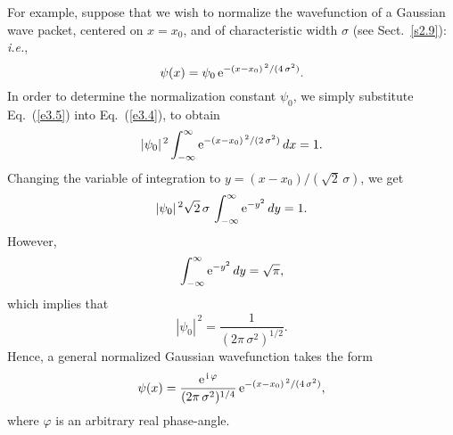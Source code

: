 For example, suppose that we wish to normalize the wavefunction of
a Gaussian wave packet, centered on $x=x_0$, and of characteristic
width $\sigma$ (see Sect.~\ref{s2.9}): {\em i.e.}, 
\begin{equation}\label{e3.5}
\psi(x) = \psi_0\,{\rm e}^{-(x-x_0)^{\,2}/(4\,\sigma^2)}.
\end{equation}
In order to determine the normalization constant $\psi_0$, we simply substitute
Eq.~(\ref{e3.5}) into Eq.~(\ref{e3.4}), to obtain
\begin{equation}
|\psi_0|^{\,2}\int_{-\infty}^{\infty}{\rm e}^{-(x-x_0)^{\,2}/(2\,\sigma^2)}\,dx = 1.
\end{equation}
Changing the variable of integration to $y=(x-x_0)/(\sqrt{2}\,\sigma)$, we get
\begin{equation}
|\psi_0|^{\,2}\sqrt{2}\,\sigma\,\int_{-\infty}^{\infty}{\rm e}^{-y^2}\,dy=1.
\end{equation}
However,
\begin{equation}\label{e3.8}
\int_{-\infty}^{\infty}{\rm e}^{-y^2}\,dy = \sqrt{\pi},
\end{equation}
which implies that
\begin{equation}
|\psi_0|^{\,2} = \frac{1}{(2\pi\,\sigma^2)^{1/2}}.
\end{equation}
Hence, a general normalized Gaussian wavefunction takes the form
\begin{equation}\label{eng}
\psi(x) = \frac{{\rm e}^{\,{\rm i}\,\varphi}}{(2\pi\,\sigma^2)^{1/4}}\,{\rm e}^{-(x-x_0)^{\,2}/(4\,\sigma^2)},
\end{equation}
where $\varphi$ is an arbitrary real phase-angle.

